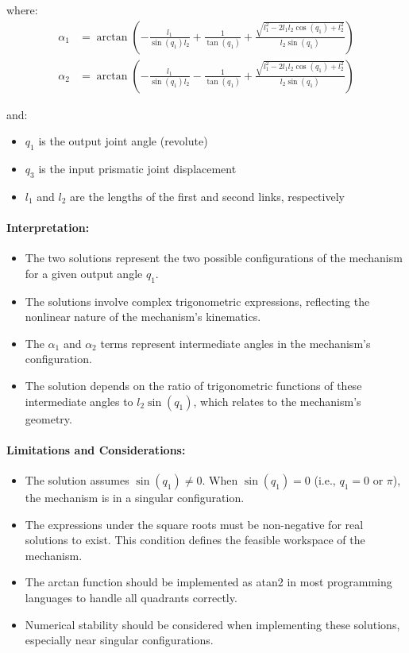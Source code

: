 \begin{solution}
where:
\begin{align*}
\alpha_1 &= \arctan\left(-\frac{l_1} {\sin(q_1)l_2} + \frac{1}{\tan(q_1)} + \frac{\sqrt{l_1^2 - 2l_1l_2\cos(q_1) + l_2^2}}{l_2 \sin(q_1)}\right) \\[10pt]
\alpha_2 &= \arctan\left(-\frac{l_1} {\sin(q_1)l_2} - \frac{1}{\tan(q_1)} + \frac{\sqrt{l_1^2 - 2l_1l_2\cos(q_1) + l_2^2}}{l_2 \sin(q_1)}\right)
\end{align*}

and:
\begin{itemize}
    \item $q_1$ is the output joint angle (revolute)
    \item $q_3$ is the input prismatic joint displacement
    \item $l_1$ and $l_2$ are the lengths of the first and second links, respectively
\end{itemize}

\paragraph{Interpretation:}
\begin{itemize}
    \item The two solutions represent the two possible configurations of the mechanism for a given output angle $q_1$.
    \item The solutions involve complex trigonometric expressions, reflecting the nonlinear nature of the mechanism's kinematics.
    \item The $\alpha_1$ and $\alpha_2$ terms represent intermediate angles in the mechanism's configuration.
    \item The solution depends on the ratio of trigonometric functions of these intermediate angles to $l_2 \sin(q_1)$, which relates to the mechanism's geometry.
\end{itemize}

\paragraph{Limitations and Considerations:}
\begin{itemize}
    \item The solution assumes $\sin(q_1) \neq 0$. When $\sin(q_1) = 0$ (i.e., $q_1 = 0$ or $\pi$), the mechanism is in a singular configuration.
    \item The expressions under the square roots must be non-negative for real solutions to exist. This condition defines the feasible workspace of the mechanism.
    \item The arctan function should be implemented as atan2 in most programming languages to handle all quadrants correctly.
    \item Numerical stability should be considered when implementing these solutions, especially near singular configurations.
\end{itemize}



\end{solution}
